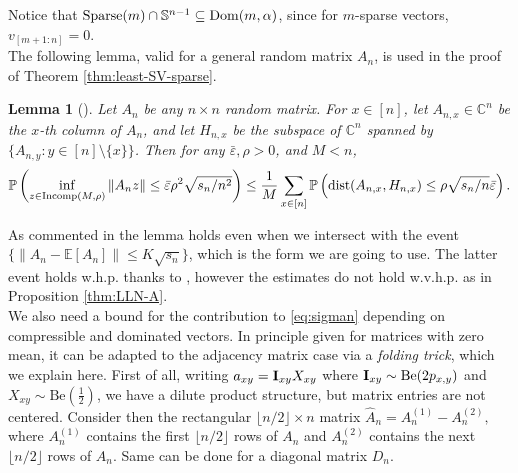 \documentclass[11pt,oneside]{amsart}
\theoremstyle{plain}
\newtheorem{lemma}[theorem]{Lemma}
\numberwithin{equation}{section}
\newcommand{\eps}{\varepsilon}
\newcommand{\E}{\mathbb{E}}
\newcommand{\p}{\mathbb{P}}
\newcommand{\ber}{\text{Be}}
\newcommand{\scaling}{s_n}
\begin{document}
Notice that ${\rm Sparse}(m) \cap \mathbb{S}^{n-1} \subseteq  {\rm Dom}(m,\alpha)$, since for $m$-sparse vectors, $v_{[m+1:n]} = 0$.\\
The following lemma, valid for a general random matrix $A_n$, is used in the proof of Theorem \ref{thm:least-SV-sparse}.
\begin{lemma}[{\cite[Lemma 2.7]{BasakRudelson19}}]
\label{lemma:distance}
    Let $A_n$ be any $n\times n$
random matrix. For $x \in [n]$, let
${A}_{n,x} \in \mathbb{C}^n$ be the $x$-th column of
$A_n$, and let $H_{n,x}$
be the subspace of $\mathbb{C}^n$ spanned by 
$\{{A}_{n,y} : y \in [n]\setminus\{x\}\}$. Then for any $\bar \eps,\rho > 0$, and
$M < n$,
\begin{equation*}
        \p\left(\inf_{z \in {\rm Incomp}(M,\rho)} \|A_nz\| \le \bar \eps \rho^2 \sqrt{\scaling/n^2}\right)
    \le \frac1{M} \sum_{x \in [n]} \p\left({\rm dist} ({A}_{n,x}, H_{n,x})\le \rho \sqrt{\scaling/n}\bar \eps\right).
 \end{equation*}
\end{lemma}
As commented in \cite[p. 2370]{BasakRudelson19} the lemma holds even when we intersect with the event $\{\|A_n-\E[A_n]\|\le K\sqrt{\scaling}\}$, which is the form we are going to use. The latter event holds w.h.p. thanks to \cite[Theorem 1.7]{BasakRudelson-invertibility}, however the estimates do not hold w.v.h.p. as in Proposition \ref{thm:LLN-A}.\\

We also need a bound for the contribution to \eqref{eq:sigman} depending on compressible and dominated vectors. In principle given for matrices with zero mean, it can be adapted to the adjacency matrix case via a \textit{folding trick}, which we explain here.
First of all, writing $a_{xy}= {\rm \bf I}_{xy} X_{xy}$ where ${\rm \bf I}_{xy} \sim \ber(2p_{x,y})$ and $X_{xy}\sim \ber(\frac12)$, we have a dilute product structure, but matrix entries are not centered. 
Consider then the rectangular $\lfloor n/2\rfloor \times n$ matrix 
$\hat A_n = A^{(1)}_n - A^{(2)}_n,$
where $A^{(1)}_n$ contains the first $\lfloor n/2 \rfloor$ rows of $A_n$ and $A^{(2)}_n$ contains the next $\lfloor n/2 \rfloor$ rows of $A_n$.  Same can be done for a diagonal matrix $D_n$.
\end{document}
